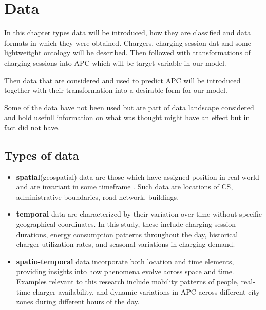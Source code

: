 \chapter{Data}
\label{ch:data}





In this chapter types data will be introduced, how they are classified and data formats in which they were obtained. Chargers, charging session dat and some lightweitght ontology will be described. Then followed with transformations of charging sessions into \acrfull{APC} which will be target variable in our model.

Then data that are considered and used to predict \acrfull{APC} will be introduced together with their transformation into a desirable form for our model.

Some of the data have not been used  but are part of data landscape considered and hold usefull information on what was thought might have an effect but in fact did not have.

\section{Types of data}

\begin{itemize}
    \item \textbf{spatial}(geospatial) data are those which have assigned position in real world and are invariant in some timeframe . Such data are locations of \acrfull{CS}, administrative boundaries, road network, buildings.
    \item \textbf{temporal} data are characterized by their variation over time without specific geographical coordinates. In this study, these include charging session durations, energy consumption patterns throughout the day, historical charger utilization rates, and seasonal variations in charging demand.
    \item \textbf{spatio-temporal} data incorporate both location and time elements, providing insights into how phenomena evolve across space and time. Examples relevant to this research include mobility patterns of people, real-time charger availability, and dynamic variations in \acrshort{APC} across different city zones during different hours of the day.
\end{itemize}

